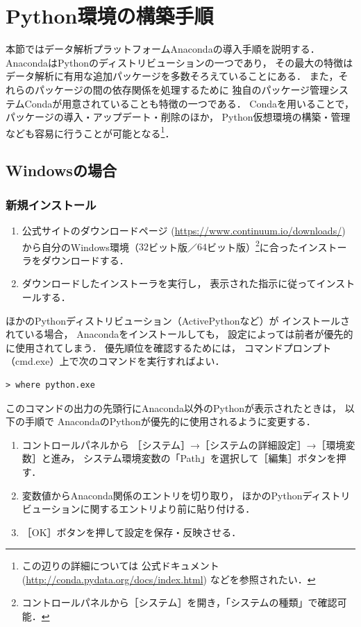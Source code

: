 \section{Python環境の構築手順}\label{sec: Python環境の構築手順}
本節ではデータ解析プラットフォームAnacondaの導入手順を説明する．
AnacondaはPythonのディストリビューションの一つであり，
その最大の特徴はデータ解析に有用な追加パッケージを多数そろえていることにある．
また，それらのパッケージの間の依存関係を処理するために
独自のパッケージ管理システムCondaが用意されていることも特徴の一つである．
Condaを用いることで，パッケージの導入・アップデート・削除のほか，
Python仮想環境の構築・管理なども容易に行うことが可能となる\footnote{%
この辺りの詳細については
公式ドキュメント
(\url{http://conda.pydata.org/docs/index.html})
などを参照されたい．
}．


\subsection{Windowsの場合}


\subsubsection{新規インストール}
\begin{enumerate}
\item
公式サイトのダウンロードページ
(\url{https://www.continuum.io/downloads/})
から自分のWindows環境（$32$ビット版／$64$ビット版）\footnote{%
コントロールパネルから［システム］を開き，「システムの種類」で確認可能．
}に合ったインストーラをダウンロードする．
\item
ダウンロードしたインストーラを実行し，
表示された指示に従ってインストールする．
\end{enumerate}

\begin{attention}
ほかのPythonディストリビューション（ActivePythonなど）が
インストールされている場合，
Anacondaをインストールしても，
設定によっては前者が優先的に使用されてしまう．
優先順位を確認するためには，
コマンドプロンプト（cmd.exe）上で次のコマンドを実行すればよい．
\begin{lstlisting}[style=cmdline]
> where python.exe
\end{lstlisting}
このコマンドの出力の先頭行にAnaconda以外のPythonが表示されたときは，
以下の手順で
AnacondaのPythonが優先的に使用されるように変更する．
\begin{enumerate}
\item
コントロールパネルから
［システム］→［システムの詳細設定］→［環境変数］と進み，
システム環境変数の「Path」を選択して［編集］ボタンを押す．
\item
変数値からAnaconda関係のエントリを切り取り，
ほかのPythonディストリビューションに関するエントリより前に貼り付ける．
\item
［OK］ボタンを押して設定を保存・反映させる．
\end{enumerate}
\end{attention}

